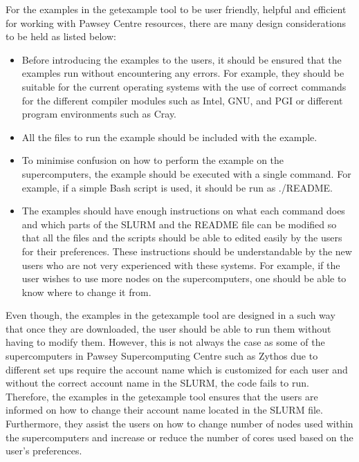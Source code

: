 For the examples in the getexample tool to be user friendly, helpful and efficient for working with Pawsey Centre resources, there are many design 
considerations to be held as listed below:

\begin{itemize}
\item Before introducing the examples to the users, it should be ensured that the examples run without encountering any errors. For example,
they should be suitable for the current operating systems with the use of correct commands for the different compiler modules such as Intel, GNU,
and PGI or different program environments such as Cray.
\item All the files to run the example should be included with the example.
\item To minimise confusion on how to perform the example on the supercomputers, the example should be executed with a single command. For example, 
if a simple Bash script is used, it should be run as ./README.
\item The examples should have enough instructions on what each command does and which parts of the SLURM and the README file can be modified so that
all the files and the scripts should be able to edited easily by the users for their preferences. These instructions should be understandable by the new 
users who are not very experienced with these systems. For example, if the user wishes to use more nodes on the supercomputers, one should be able to 
know where to change it from.
\end{itemize}
 
Even though, the examples in the getexample tool are designed in a such way that once they are downloaded, the user should be able to run them without
having to modify them. However, this is not always the case as some of the supercomputers in Pawsey Supercomputing Centre such as Zythos due to
different set ups require the account name which is customized for each user and without the correct account name in the SLURM, the code fails to run. 
Therefore, the examples in the getexample tool ensures that the users are informed on how to change their account name located in the SLURM file.
Furthermore, they assist the users on how to change number of nodes used within the supercomputers and increase or reduce the number of cores used
based on the user's preferences.

